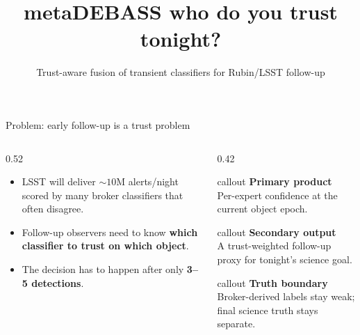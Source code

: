 \documentclass[aspectratio=169]{beamer}
\title{metaDEBASS \textemdash{} who do you trust tonight?}
\subtitle{Trust-aware fusion of transient classifiers for Rubin/LSST follow-up}
\author{}
\date{}
\newcommand{\calloutbox}[2]{%
  \begin{beamercolorbox}[wd=\linewidth,sep=0.7em,rounded=true,shadow=false]{callout}
    {\bfseries\color{navy}#1}\\[-0.1em]
    {\footnotesize\color{slate}#2}
  \end{beamercolorbox}
}
\begin{document}
\begin{frame}[plain]
  \vspace{1.1cm}
  {\inserttitle\par}
  \vspace{0.35cm}
  {\insertsubtitle\par}
  \vfill
\end{frame}

\begin{frame}{Problem: early follow-up is a trust problem}
  \begin{columns}[T,totalwidth=\textwidth]
    \begin{column}{0.52\textwidth}
      \begin{itemize}
        \item LSST will deliver $\sim 10\mathrm{M}$ alerts/night scored by many broker classifiers that often disagree.
        \item Follow-up observers need to know \textbf{which classifier to trust on which object}.
        \item The decision has to happen after only \textbf{3--5 detections}.
      \end{itemize}
    \end{column}
    \begin{column}{0.42\textwidth}
      \calloutbox{Primary product}{Per-expert confidence at the current object epoch.}
      \vspace{0.6em}
      \calloutbox{Secondary output}{A trust-weighted follow-up proxy for tonight's science goal.}
      \vspace{0.6em}
      \calloutbox{Truth boundary}{Broker-derived labels stay weak; final science truth stays separate.}
    \end{column}
  \end{columns}
\end{frame}
\end{document}
